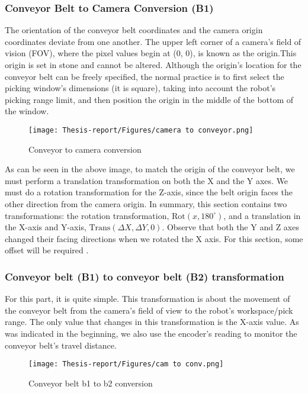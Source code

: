 \documentclass[12pt]{article}
\begin{document}
\subsubsection{Conveyor Belt to Camera Conversion (B1)}
The orientation of the conveyor belt coordinates and the camera origin coordinates deviate from one another. The upper left corner of a camera's field of vision (FOV), where the pixel values begin at (0, 0), is known as the origin.This origin is set in stone and cannot be altered. Although the origin's location for the conveyor belt can be freely specified, the normal practice is to first select the picking window's dimensions (it is square), taking into account the robot's picking range limit, and then position the origin in the middle of the bottom of the window\cite{ref25}.\\

\begin{figure}[h]
    \centering
    \texttt{[image: Thesis-report/Figures/camera to conveyor.png]}
    \caption{Conveyor to camera conversion \cite{ref25}}
    \label{fig:conveyor}
\end{figure}
As can be seen in the above image, to match the origin of the conveyor belt, we must perform a translation transformation on both the X and the Y axes. We must do a rotation transformation for the Z-axis, since the belt origin faces the other direction from the camera origin. In summary, this section contains two transformations: the rotation transformation, $\text{Rot}(x, 180^\circ)$, and a translation in the X-axis and Y-axis, $\text{Trans}(\Delta X, \Delta Y, 0)$. Observe that both the Y and Z axes changed their facing directions when we rotated the X axis. For this section, some offset will be required \cite {ref25}.\\

\subsubsection{Conveyor belt (B1) to conveyor belt (B2) transformation}
For this part, it is quite simple. This transformation is about the movement of the conveyor belt from the camera’s field of view to the robot’s workspace/pick range. The only value that changes in this transformation is the X-axis value. As was indicated in the beginning, we also use the encoder's reading to monitor the conveyor belt's travel distance\cite{ref25}.\\

\begin{figure}[h]
    \centering
    \texttt{[image: Thesis-report/Figures/cam to conv.png]}
    \caption{Conveyor belt b1 to b2 conversion \cite{ref25}}
    \label{fig:conv-b12}
\end{figure}
\newpage
\end{document}
